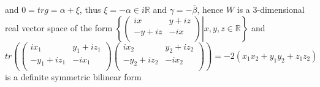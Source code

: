\documentclass[10pt]{article}
\newcommand{\<}[1]{\langle #1 \rangle}
\begin{document}
and $0=trg=\alpha+\xi$, thus $\xi=-\alpha\in i\mathbb{R}$ and $\gamma=-\bar\beta$, hence $W$ is a 3-dimensional real vector space of the form
$
\left\{\left( {\begin{array}{cc}
   ix &y+iz \\
  -y+iz & -ix \\
  \end{array} } \right)\left.\right|x,y,z\in\mathbb{R}\right\}
$
and $tr\left(\left( {\begin{array}{cc}
   ix_1 &y_1+iz_1 \\
  -y_1+iz_1 & -ix_1 \\
  \end{array} } \right)\left( {\begin{array}{cc}
   ix_2 &y_2+iz_2\\
  -y_2+iz_2 & -ix_2 \\
  \end{array} } \right)\right)=-2(x_1x_2+y_1y_2+z_1z_2)$ is a definite symmetric bilinear form \par
\end{document}
